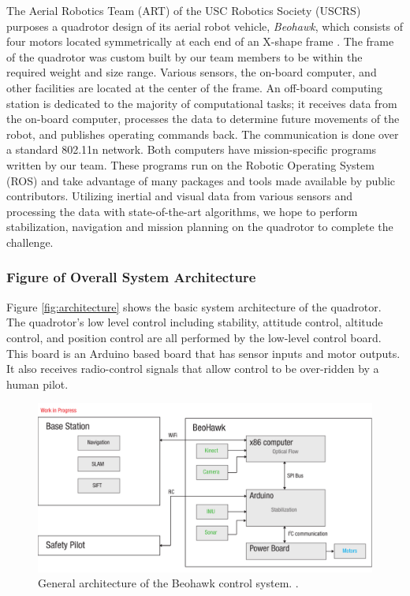 \documentclass[12pt, letterpaper]{article}
\begin{document}
The Aerial Robotics Team (ART) of the USC Robotics Society (USCRS) purposes a quadrotor design of its aerial robot vehicle, \textit{Beohawk}, which consists of four motors located symmetrically at each end of an X-shape frame . The frame of the quadrotor was custom built by our team members to be within the required weight and size range. Various sensors, the on-board computer, and other facilities are located at the center of the frame. An off-board computing station is dedicated to the majority of computational tasks; it receives data from the on-board computer, processes the data to determine future movements of the robot, and publishes operating commands back. The communication is done over a standard 802.11n network. Both computers have mission-specific programs written by our team. These programs run on the Robotic Operating System (ROS) and take advantage of many packages and tools made available by public contributors. Utilizing inertial and visual data from various sensors and processing the data with state-of-the-art algorithms, we hope to perform stabilization, navigation and mission planning on the quadrotor to complete the challenge.

\subsubsection{Figure of Overall System Architecture}

Figure \eqref{fig:architecture} shows the basic system architecture of the quadrotor. The quadrotor's low level control including stability, attitude control, altitude control, and position control are all performed by the low-level control board. This board is an Arduino based board that has sensor inputs and motor outputs. It also receives radio-control signals that allow control to be over-ridden by a human pilot.

\begin{figure}[h]
\centering
\includegraphics[width=14cm]{images/beohawk-system-arch.pdf}
\caption{General architecture of the Beohawk control system. .} 
\label{fig:architecture}
\end{figure}
\end{document}
